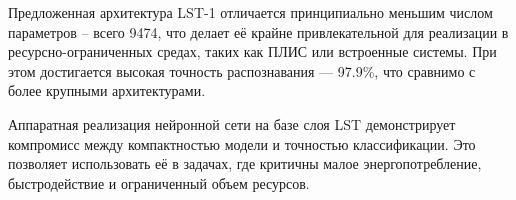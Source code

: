 Предложенная архитектура LST-1 отличается принципиально меньшим числом 
параметров – всего 9474, что делает её крайне привлекательной для реализации в 
ресурсно-ограниченных средах, таких как ПЛИС или встроенные системы. При этом 
достигается высокая точность распознавания — 97.9\%, что сравнимо с более 
крупными архитектурами.

Аппаратная реализация нейронной сети на базе слоя LST 
демонстрирует компромисс между компактностью модели и точностью классификации. 
Это позволяет использовать её в задачах, где критичны малое энергопотребление, 
быстродействие и ограниченный объем ресурсов.



